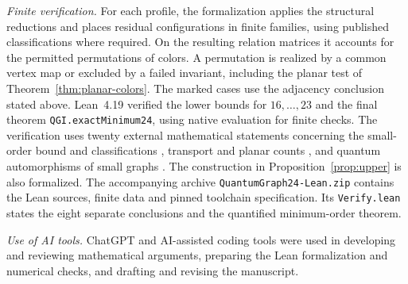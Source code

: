 \documentclass[11pt,reqno]{amsart}
\numberwithin{equation}{section}
\theoremstyle{definition}
\begin{document}
\smallskip
\noindent\emph{Finite verification.} For each profile, the formalization applies the structural reductions and places residual configurations in finite families, using published classifications where required. On the resulting relation matrices it accounts for the permitted permutations of colors. A permutation is realized by a common vertex map or excluded by a failed invariant, including the planar test of Theorem~\ref{thm:planar-colors}. The marked cases use the adjacency conclusion stated above. Lean~4.19 verified the lower bounds for $16,\ldots,23$ and the final theorem \texttt{QGI.exactMinimum24}, using native evaluation for finite checks. The verification uses twenty external mathematical statements concerning the small-order bound and classifications \cite{Schmidt,FKV,ZivAv,HM,HData,SS,SH}, transport and planar counts \cite{LMR,Meunier,MR,CY}, and quantum automorphisms of small graphs \cite{BB,SP,SDT}. The construction in Proposition~\ref{prop:upper} is also formalized. The accompanying archive \texttt{QuantumGraph24-Lean.zip} contains the Lean sources, finite data and pinned toolchain specification. Its \texttt{Verify.lean} states the eight separate conclusions and the quantified minimum-order theorem.

\smallskip
\noindent\emph{Use of AI tools.} ChatGPT and AI-assisted coding tools were used in developing and reviewing mathematical arguments, preparing the Lean formalization and numerical checks, and drafting and revising the manuscript.
\end{document}
